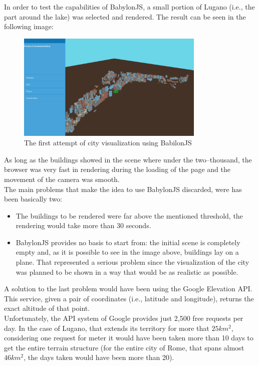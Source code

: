 In order to test the capabilities of BabylonJS, a small portion of Lugano (i.e., the part around the lake) was selected and rendered. The result can be seen in the following image:
\begin{figure}[H]
\centering
\includegraphics[width=0.8\textwidth]{chapter3/images/babylonJS}
\caption{The first attempt of city visualization using BabilonJS}
\label{fig:babilonJS}
\end{figure}
As long as the buildings showed in the scene where under the two--thousand, the browser was very fast in rendering during the loading of the page and the movement of the camera was smooth.\\
The main problems that make the idea to use BabylonJS discarded, were has been basically two:
\begin{itemize}
	\item The buildings to be rendered were far above the mentioned threshold, the rendering would take more than 30 seconds.
	\item BabylonJS provides no basis to start from: the initial scene is completely empty and, as it is possible to see in the image above, buildings lay on a plane. That represented a serious problem since the visualization of the city was planned to be shown in a way that would be as realistic as possible.
\end{itemize}
A solution to the last problem would have been using the Google Elevation API. This service, given a pair of coordinates (i.e., latitude and longitude), returns the exact altitude of that point.\\

Unfortunately, the API system of Google provides just 2,500 free requests per day. In the case of Lugano, that extends its territory for more that $25km^2$, considering one request for meter it would have been taken more than 10 days to get the entire terrain structure (for the entire city of Rome, that spans almost $46km^2$, the days taken would have been more than 20).\\

